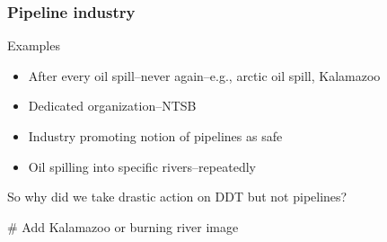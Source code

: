 \begin{frame}
\frametitle{Pipeline industry}
	\begin{block}{Examples}
		\begin{itemize}
			\item After every oil spill--never again--e.g., arctic oil spill, Kalamazoo
			\item Dedicated organization--NTSB
			\item Industry promoting notion of pipelines as safe
			\item Oil spilling into specific rivers--repeatedly
		\end{itemize}
	\end{block}
	\hrulefill

	So why did we take drastic action on DDT but not pipelines?

	\# Add Kalamazoo or burning river image
\end{frame}

\blackgroup
\begin{frame}[plain]
\end{frame}
\egroup
